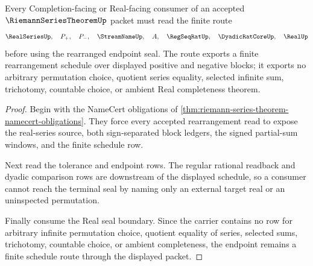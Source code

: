 \begin{theorem}
\label{thm:riemann-series-theorem-rearrangement-route}
Every Completion-facing or Real-facing consumer of an accepted $\RiemannSeriesTheoremUp$ packet must read the finite route
$$
\RealSeriesUp,\quad
P_{+},\quad
P_{-},\quad
\StreamNameUp,\quad
A,\quad
\RegSeqRatUp,\quad
\DyadicRatCoreUp,\quad
\RealUp
$$
before using the rearranged endpoint seal. The route exports a finite rearrangement schedule over displayed positive and negative blocks; it exports no arbitrary permutation choice, quotient series equality, selected infinite sum, trichotomy, countable choice, or ambient Real completeness theorem.
\end{theorem}
\begin{proof}
Begin with the NameCert obligations of \autoref{thm:riemann-series-theorem-namecert-obligations}. They force every accepted rearrangement read to expose the real-series source, both sign-separated block ledgers, the signed partial-sum windows, and the finite schedule row.

Next read the tolerance and endpoint rows. The regular rational readback and dyadic comparison rows are downstream of the displayed schedule, so a consumer cannot reach the terminal seal by naming only an external target real or an uninspected permutation.

Finally consume the Real seal boundary. Since the carrier contains no row for arbitrary infinite permutation choice, quotient equality of series, selected sums, trichotomy, countable choice, or ambient completeness, the endpoint remains a finite schedule route through the displayed packet.
\end{proof}



